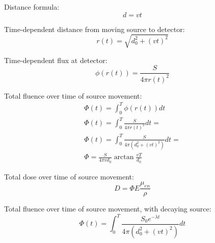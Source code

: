 \documentclass[12pt]{article}
\begin{document}
\maketitle

Distance formula:
\begin{equation}\label{eq:distance}
  d = vt
\end{equation}

Time-dependent distance from moving source to detector:
\begin{equation}\label{eq:r_t}
  r(t) = \sqrt{d_{0}^2 + (vt)^2}
\end{equation}

Time-dependent flux at detector:
\begin{equation}\label{eq:flux}
  \phi(r(t)) = \frac{S}{4 \pi r(t)^2}
\end{equation}

Total fluence over time of source movement:
\begin{equation}\label{eq:fluence}
\begin{gathered}
  \Phi(t) = \int_0^T \phi(r(t)) dt \\
  \Phi(t) = \int_0^T \frac{S}{4 \pi r(t)^2} dt = \\
  \Phi(t) = \int_0^T \frac{S}{4 \pi (d_{0}^2 + (vt)^2)} dt = \\
  \Phi = \frac{S}{4 \pi v d_0} \arctan {\frac{vT}{d_0}}
\end{gathered}
\end{equation}

Total dose over time of source movement:
\begin{equation}\label{eq:fluence}
  D = \Phi E \frac{\mu_{en}}{\rho}
\end{equation}

Total fluence over time of source movement, with decaying source:
\begin{equation}\label{eq:fluence}
  \Phi(t) = \int_0^T \frac{S_0 e^{-\lambda t}}{4 \pi (d_{0}^2 + (vt)^2)} dt
\end{equation}
\end{document}
